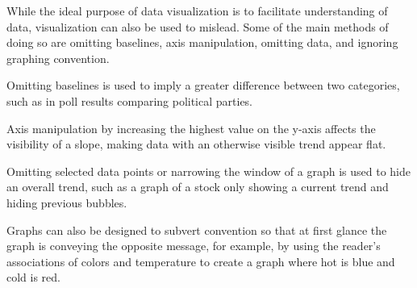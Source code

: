\documentclass[]{book}
\theoremstyle{definition}
\theoremstyle{definition}
\theoremstyle{definition}
\theoremstyle{remark}
\begin{document}
While the ideal purpose of data visualization is to facilitate
understanding of data, visualization can also be used to mislead. Some
of the main methods of doing so are omitting baselines, axis
manipulation, omitting data, and ignoring graphing convention.

Omitting baselines is used to imply a greater difference between two
categories, such as in poll results comparing political parties.

Axis manipulation by increasing the highest value on the y-axis affects
the visibility of a slope, making data with an otherwise visible trend
appear flat.

Omitting selected data points or narrowing the window of a graph is used
to hide an overall trend, such as a graph of a stock only showing a
current trend and hiding previous bubbles.

Graphs can also be designed to subvert convention so that at first
glance the graph is conveying the opposite message, for example, by
using the reader's associations of colors and temperature to create a
graph where hot is blue and cold is red.
\end{document}
